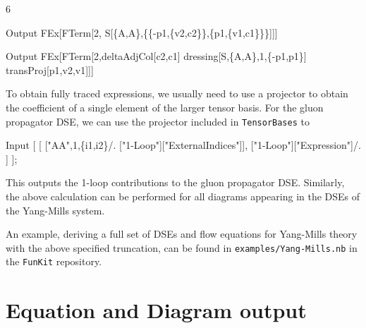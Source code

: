 6\documentclass[10pt,prd,nofootinbib,superscriptaddress,twocolumn]{revtex4-2}
\newcommand{\FunKit}{\texttt{FunKit}\xspace}
\newcommand{\TensorBases}{\texttt{TensorBases}\xspace}
\begin{document}
%
\begin{mmaCell}{Output}
 FEx[FTerm[2,
   S[\{A,A\},\{\{-p1,\{v2,c2\}\},\{p1,\{v1,c1\}\}\}]]]
\end{mmaCell}
%
\begin{mmaCell}{Output}
 FEx[FTerm[2,deltaAdjCol[c2,c1]
   dressing[S,\{A,A\},1,\{-p1,p1\}]
   transProj[p1,v2,v1]]]
\end{mmaCell}
%
To obtain fully traced expressions, we usually need to use a projector to obtain the coefficient of a single element of the larger tensor basis. For the gluon propagator DSE, we can use the projector included in \TensorBases to 
%
\begin{mmaCell}{Input}
 [
   [
     ["AA",1,\{i1,i2\}/.
       ["1-Loop"]["ExternalIndices"]], ["1-Loop"]["Expression"]/.
   ]
 ];
\end{mmaCell}
%
This outputs the 1-loop contributions to the gluon propagator DSE. Similarly, the above calculation can be performed for all diagrams appearing in the DSEs of the Yang-Mills system.

An example, deriving a full set of DSEs and flow equations for Yang-Mills theory with the above specified truncation, can be found in \texttt{examples/Yang-Mills.nb} in the \FunKit repository.


\section{Equation and Diagram output}
\label{sec:DiANE}
\end{document}
